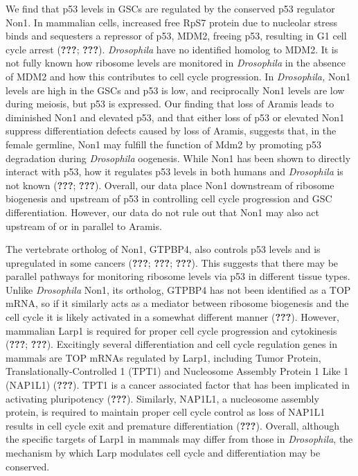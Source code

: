 \documentclass[12pt,oneside]{reedthesis}
\begin{document}
We find that p53 levels in GSCs are regulated by the conserved p53 regulator Non1. In mammalian cells, increased free RpS7 protein due to nucleolar stress binds and sequesters a repressor of p53, MDM2, freeing p53, resulting in G1 cell cycle arrest ({\textbf{???}}; {\textbf{???}}). \emph{Drosophila} have no identified homolog to MDM2. It is not fully known how ribosome levels are monitored in \emph{Drosophila} in the absence of MDM2 and how this contributes to cell cycle progression. In \emph{Drosophila,} Non1 levels are high in the GSCs and p53 is low, and reciprocally Non1 levels are low during meiosis, but p53 is expressed. Our finding that loss of Aramis leads to diminished Non1 and elevated p53, and that either loss of p53 or elevated Non1 suppress differentiation defects caused by loss of Aramis, suggests that, in the female germline, Non1 may fulfill the function of Mdm2 by promoting p53 degradation during \emph{Drosophila} oogenesis. While Non1 has been shown to directly interact with p53, how it regulates p53 levels in both humans and \emph{Drosophila} is not known ({\textbf{???}}; {\textbf{???}}). Overall, our data place Non1 downstream of ribosome biogenesis and upstream of p53 in controlling cell cycle progression and GSC differentiation. However, our data do not rule out that Non1 may also act upstream of or in parallel to Aramis.

The vertebrate ortholog of Non1, GTPBP4, also controls p53 levels and is upregulated in some cancers ({\textbf{???}}; {\textbf{???}}; {\textbf{???}}). This suggests that there may be parallel pathways for monitoring ribosome levels via p53 in different tissue types. Unlike \emph{Drosophila} Non1, its ortholog, GTPBP4 has not been identified as a TOP mRNA, so if it similarly acts as a mediator between ribosome biogenesis and the cell cycle it is likely activated in a somewhat different manner ({\textbf{???}}). However, mammalian Larp1 is required for proper cell cycle progression and cytokinesis ({\textbf{???}}; {\textbf{???}}). Excitingly several differentiation and cell cycle regulation genes in mammals are TOP mRNAs regulated by Larp1, including Tumor Protein, Translationally-Controlled 1 (TPT1) and Nucleosome Assembly Protein 1 Like 1 (NAP1L1) ({\textbf{???}}). TPT1 is a cancer associated factor that has been implicated in activating pluripotency ({\textbf{???}}). Similarly, NAP1L1, a nucleosome assembly protein, is required to maintain proper cell cycle control as loss of NAP1L1 results in cell cycle exit and premature differentiation ({\textbf{???}}). Overall, although the specific targets of Larp1 in mammals may differ from those in \emph{Drosophila}, the mechanism by which Larp modulates cell cycle and differentiation may be conserved.
\end{document}
